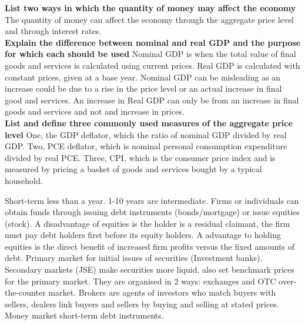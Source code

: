 \documentclass[12pt]{examnotes}
\begin{document}
\textbf{List two ways in which the quantity of money may affect the economy}
The quantity of money can affect the economy through the aggregate price level and through interest rates. \\

\textbf{Explain the difference between nominal and real GDP and the purpose for which each should be used}
Nominal GDP is when the total value of final goods and services is calculated using current prices. Real GDP is calculated with constant prices, given at a base year. Nominal GDP can be misleading as an increase could be due to a rise in the price level or an actual increase in final good and services. An increase in Real GDP can only be from an increase in final goods and services and not and increase in prices. \\

\textbf{List and define three commonly used measures of the aggregate price level}
One, the GDP deflator, which the ratio of nominal GDP divided by real GDP. Two, PCE deflator, which is nominal personal consumption expenditure divided by real PCE. Three, CPI, which is the consumer price index and is measured by pricing a basket of goods and services bought by a typical household. 

Short-term less than a year. 1-10 years are intermediate. Firms or individuals can obtain funds through issuing debt instruments (bonds/mortgage) or issue equities (stock). A disadvantage of equities is the holder is a residual claimant, the firm must pay debt holders first before its equity holders. A advantage to holding equities is the direct benefit of increased firm profits versus the fixed amounts of debt. 
Primary market for initial issues of securities (Investment banks). 
Secondary markets (JSE) make securities more liquid, also set benchmark prices for the primary market. They are organised in 2 ways: exchanges and OTC over-the-counter market. 
Brokers are agents of investors who match buyers with sellers, dealers link buyers and sellers by buying and selling at stated prices. 
Money market short-term debt instruments.
\end{document}
